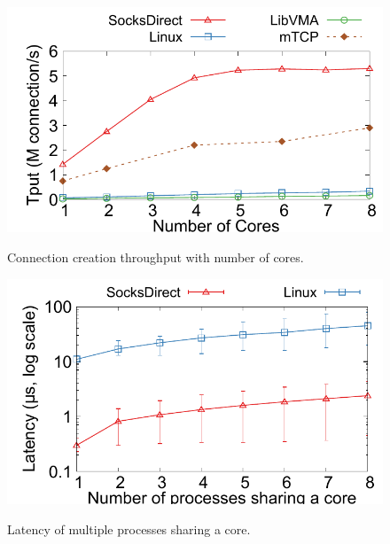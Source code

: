 \begin{figure}[t!]
\begin{minipage}{.31\textwidth}
		\centering
		\includegraphics[width=\textwidth]{eval/microbenchmark/conn-setup-tput.pdf}
		\vspace{-10pt}
		\caption{Connection creation throughput with number of cores.}
		\label{fig:eval-conn-setup-tput}
		
		\centering \includegraphics[width=\textwidth]{eval/microbenchmark/sharecore-lat.pdf}
		\vspace{-15pt}
		\label{fig:eval-context-switch}
		\caption{Latency of multiple processes sharing a core.}
	\end{minipage}
	\hspace{0.01\textwidth}
	\begin{minipage}{.31\textwidth}
		

\end{minipage}
\end{figure}
